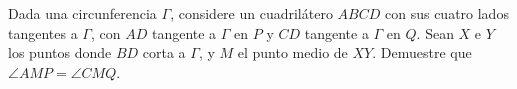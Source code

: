 Dada una circunferencia $\Gamma$, considere un cuadrilátero $ABCD$ con sus cuatro lados tangentes a $\Gamma$, con $AD$ tangente a $\Gamma$ en $P$ y $CD$ tangente a $\Gamma$ en $Q$. Sean $X$ e $Y$ los puntos donde $BD$ corta a $\Gamma$, y $M$ el punto medio de $XY$. Demuestre que $\angle AMP = \angle CMQ$.
